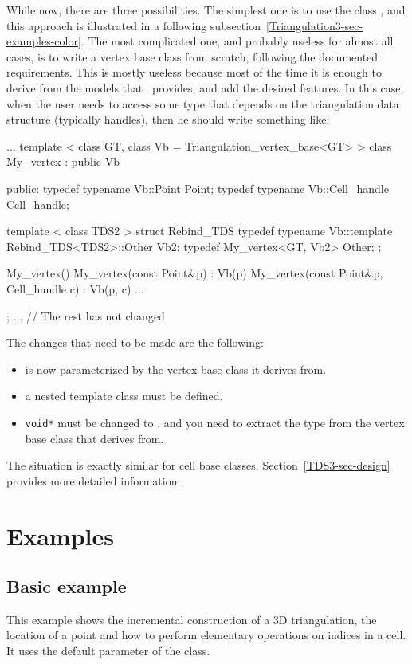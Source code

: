 While now, there are three possibilities.  The simplest one is to use the
class , and this approach is
illustrated in a following subsection~\ref{Triangulation3-sec-examples-color}.
The most complicated one, and probably useless for almost all cases, is to
write a vertex base class from scratch, following the documented requirements.
This is mostly useless because most of the time it is enough to derive from
the models that \cgal\ provides, and add the desired features.
In this case, when the user needs to access some type that depends on the
triangulation data structure (typically handles), then he should write
something like:
\begin{ccExampleCode}
...
template < class GT, class Vb = Triangulation_vertex_base<GT> >
class My_vertex
  : public Vb
{
public:
  typedef typename Vb::Point           Point;
  typedef typename Vb::Cell_handle     Cell_handle;

  template < class TDS2 >
  struct Rebind_TDS {
    typedef typename Vb::template Rebind_TDS<TDS2>::Other  Vb2;
    typedef My_vertex<GT, Vb2>                             Other;
  };

  My_vertex() {}
  My_vertex(const Point&p)                : Vb(p) {}
  My_vertex(const Point&p, Cell_handle c) : Vb(p, c) {}
...
};
... // The rest has not changed
\end{ccExampleCode}

The changes that need to be made are the following:
\begin{itemize}
\item{}  is now parameterized by the vertex base class it
        derives from.
\item{} a nested template class  must be defined.
\item{} \texttt{void*} must be changed to , and you need to
        extract the  type from the vertex base class that
         derives from.
\end{itemize}

The situation is exactly similar for cell base classes.
Section~\ref{TDS3-sec-design} provides more detailed information.

\section{Examples}
\label{Triangulation3-sec-examples}
\subsection{Basic example}
This example shows the incremental construction of a 3D triangulation, the
location of a point and how to perform elementary operations on indices in a
cell. It uses the default parameter of the  class.


